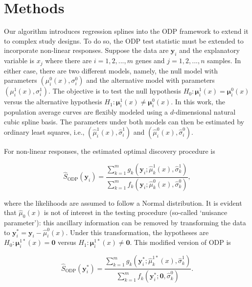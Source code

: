 \documentclass[11pt]{article}
\begin{document}
\section{Methods\label{Subsec:algorithm}}
\label{sec:godp}

Our algorithm introduces regression splines into the ODP framework to extend it to complex study designs. To do so, the ODP test statistic must be extended to incorporate non-linear responses. Suppose the data are $\mathbf{y}_{i}$ and the explanatory variable is $x_{j}$ where there are $i = 1,2, ..., m$ genes and $j = 1,2,...,n$ samples. In either case, there are two different models, namely, the null model with parameters $(\mu^{0}_{i}(x), \sigma_{i}^{0})$ and the alternative model with parameters $(\mu^{1}_{i}(x), \sigma_{i}^{1})$. The objective is to test the null hypothesis $H_{0}: \mathbf{\mu}^{1}_{i}(x) = \mathbf{\mu}^{0}_{i}(x)$ versus the alternative hypothesis $H_{1}: \mathbf{\mu}^{1}_{i}(x) \neq \mathbf{\mu}^{0}_{i}(x)$. In this work, the population average curves are flexibly modeled using a $d$-dimensional natural cubic spline basis. The parameters under both models can then be estimated by ordinary least squares, i.e., $(\hat{\mu}^{1}_{i}(x), \hat{\sigma}_{i}^{1})$ and $(\hat{\mu}^{0}_{i}(x), \hat{\sigma}_{i}^{0})$. 

For non-linear responses, the estimated optimal discovery procedure is

\begin{equation}
\hat{S}_{\text{ODP}}(\mathbf{y}_{i}) = \dfrac{\sum_{k=1}^{m} g_{k}(\mathbf{y}_{i}; \hat{\mu}^{1}_{k}(x), \hat{\sigma}_{k}^{1})}{\sum_{k=1}^{m} f_{k}(\mathbf{y}_{i}; \hat{\mu}^{0}_{k}(x), \hat{\sigma}_{k}^{0})},
\end{equation}

\noindent where the likelihoods are assumed to follow a Normal distribution. It is evident that $\hat{\mu}_{0}(x)$ is not of interest in the testing procedure (so-called `nuisance parameter'): this ancillary information can be removed by transforming the data to $\mathbf{y}_{i}^{*} = \mathbf{y}_{i} - \hat{\mu}_{i}^{0}(x)$. Under this transformation, the hypotheses are $H_{0}: \mathbf{\mu}_{i}^{1*}(x) = \mathbf{0}$ versus $H_{1}: \mathbf{\mu}_{i}^{1*}(x) \neq \mathbf{0}$. This modified version of ODP is

\begin{equation}
\hat{S}_{\text{ODP}}(\mathbf{y}^{*}_{i}) = \dfrac{\sum_{k=1}^{m} g_{k}(\mathbf{y}^{*}_{i}; \hat{\mu}^{1*}_{k}(x), \hat{\sigma}_{k}^{1})}{\sum_{k=1}^{m} f_{k}(\mathbf{y}^{*}_{i}; \mathbf{0}, \hat{\sigma}_{k}^{0})}.
\end{equation}
\end{document}
